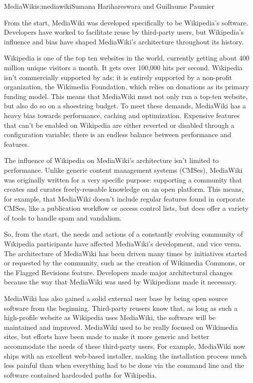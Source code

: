 \begin{aosachapter}{MediaWiki}{s:mediawiki}{Sumana Harihareswara and Guillaume Paumier}

From the start, MediaWiki was developed specifically to be Wikipedia's
software. Developers have worked to facilitate reuse by third-party
users, but Wikipedia's influence and bias have shaped MediaWiki's
architecture throughout its history.

Wikipedia is one of the top ten websites in the world, currently
getting about 400 million unique visitors a month. It gets over
100,000 hits per second. Wikipedia isn't commercially supported by
ads; it is entirely supported by a non-profit organization, the
Wikimedia Foundation, which relies on donations as its primary funding
model. This means that MediaWiki must not only run a top-ten website,
but also do so on a shoestring budget. To meet these demands,
MediaWiki has a heavy bias towards performance, caching and
optimization. Expensive features that can't be enabled on Wikipedia
are either reverted or disabled through a configuration variable;
there is an endless balance between performance and features.

The influence of Wikipedia on MediaWiki's architecture isn't limited
to performance. Unlike generic content management systems (CMSes),
MediaWiki was originally written for a very specific purpose:
supporting a community that creates and curates freely-reusable
knowledge on an open platform. This means, for example, that MediaWiki
doesn't include regular features found in corporate CMSes, like a
publication workflow or access control lists, but does offer a variety
of tools to handle spam and vandalism.

So, from the start, the needs and actions of a constantly evolving
community of Wikipedia participants have affected MediaWiki's
development, and vice versa. The architecture of MediaWiki has been
driven many times by initiatives started or requested by the
community, such as the creation of Wikimedia Commons, or the Flagged
Revisions feature. Developers made major architectural changes because
the way that MediaWiki was used by Wikipedians made it necessary.

MediaWiki has also gained a solid external user base by being
open source software from the beginning. Third-party reusers know
that, as long as such a high-profile website as Wikipedia uses
MediaWiki, the software will be maintained and improved. MediaWiki
used to be really focused on Wikimedia sites, but efforts have been
made to make it more generic and better accommodate the needs of these
third-party users. For example, MediaWiki now ships with an excellent
web-based installer, making the installation process much less painful
than when everything had to be done via the command line and the
software contained hardcoded paths for Wikipedia.


\end{aosachapter}
